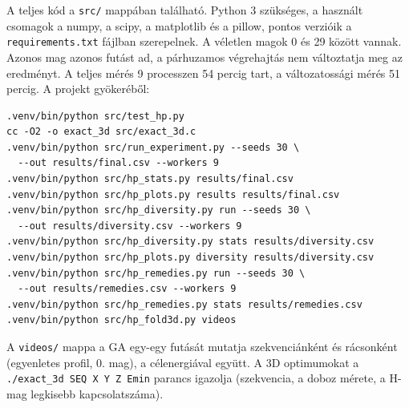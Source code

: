 \documentclass[11pt,a4paper]{article}
\begin{document}
A teljes kód a \texttt{src/} mappában található. Python 3 szükséges, a használt
csomagok a numpy, a scipy, a matplotlib és a pillow, pontos verzióik a
\texttt{requirements.txt} fájlban szerepelnek. A véletlen magok 0 és 29 között
vannak. Azonos mag azonos futást ad,
a párhuzamos végrehajtás nem változtatja meg az eredményt. A teljes mérés 9
processzen 54 percig tart, a változatossági mérés 51 percig. A projekt gyökeréből:
\begin{verbatim}
.venv/bin/python src/test_hp.py
cc -O2 -o exact_3d src/exact_3d.c
.venv/bin/python src/run_experiment.py --seeds 30 \
  --out results/final.csv --workers 9
.venv/bin/python src/hp_stats.py results/final.csv
.venv/bin/python src/hp_plots.py results results/final.csv
.venv/bin/python src/hp_diversity.py run --seeds 30 \
  --out results/diversity.csv --workers 9
.venv/bin/python src/hp_diversity.py stats results/diversity.csv
.venv/bin/python src/hp_plots.py diversity results/diversity.csv
.venv/bin/python src/hp_remedies.py run --seeds 30 \
  --out results/remedies.csv --workers 9
.venv/bin/python src/hp_remedies.py stats results/remedies.csv
.venv/bin/python src/hp_fold3d.py videos
\end{verbatim}
A \texttt{videos/} mappa a GA egy-egy futását mutatja szekvenciánként és
rácsonként (egyenletes profil, 0. mag), a célenergiával együtt. A 3D optimumokat a
\texttt{./exact\_3d SEQ X Y Z Emin} parancs igazolja (szekvencia, a doboz mérete,
a H-mag legkisebb kapcsolatszáma).
\end{document}
